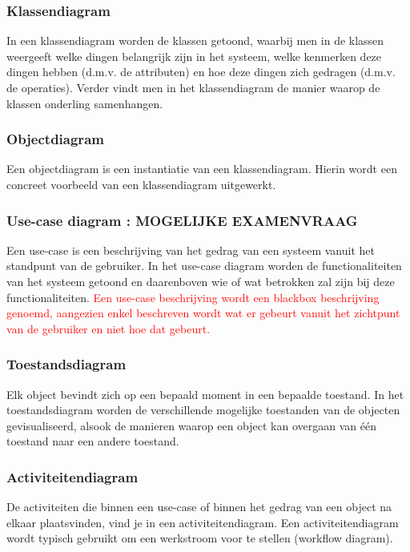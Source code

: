 \subsubsection{Klassendiagram}

In een klassendiagram worden de klassen getoond, waarbij men in de klassen weergeeft welke dingen belangrijk zijn in het systeem, welke kenmerken deze dingen hebben (d.m.v. de attributen) en hoe deze dingen zich gedragen (d.m.v. de operaties). Verder vindt men in het klassendiagram de manier waarop de klassen onderling samenhangen.

\subsubsection{Objectdiagram}

Een objectdiagram is een instantiatie van een klassendiagram. Hierin wordt een concreet voorbeeld van een klassendiagram uitgewerkt.

\subsubsection{Use-case diagram : MOGELIJKE EXAMENVRAAG}

Een use-case is een beschrijving van het gedrag van een systeem vanuit het standpunt van de gebruiker. In het use-case diagram worden de functionaliteiten van het systeem getoond en daarenboven wie of wat betrokken zal zijn bij deze functionaliteiten. \textcolor{red}{Een use-case beschrijving wordt een blackbox beschrijving genoemd, aangezien enkel beschreven wordt wat er gebeurt vanuit het zichtpunt van de gebruiker en niet hoe dat gebeurt.}
\newpage
\subsubsection{Toestandsdiagram}

Elk object bevindt zich op een bepaald moment in een bepaalde toestand. In het toestandsdiagram worden de verschillende mogelijke toestanden van de objecten gevisualiseerd, alsook de manieren waarop een object kan overgaan van één toestand naar een andere toestand.

\subsubsection{Activiteitendiagram}

De activiteiten die binnen een use-case of binnen het gedrag van een object na elkaar plaatsvinden, vind je in een activiteitendiagram. Een activiteitendiagram wordt typisch gebruikt om een werkstroom voor te stellen (workflow diagram).

